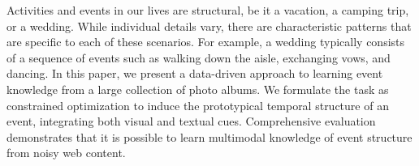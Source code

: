 Activities and events in our lives are structural, be it a vacation, a camping trip, or a wedding. While individual details vary, there are characteristic patterns that are specific to each of these scenarios. For example, a wedding typically consists of a sequence of events such as walking down the aisle, exchanging vows, and dancing. In this paper, we present a data-driven approach to learning event knowledge from a large collection of photo albums. We formulate the task as constrained optimization to induce the prototypical temporal structure of an event, integrating both visual and textual cues. Comprehensive evaluation demonstrates that it is possible to learn multimodal knowledge of event structure from noisy web content.
